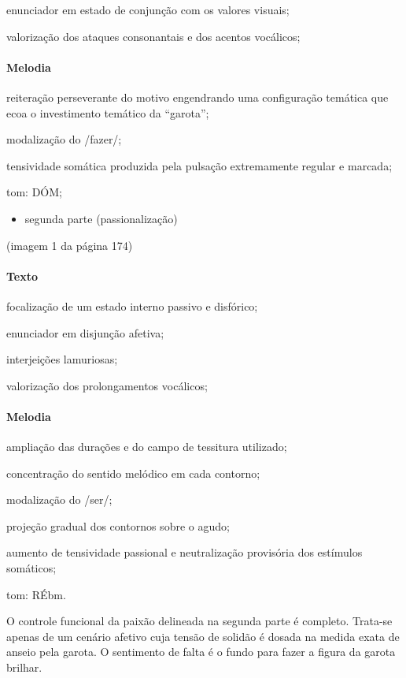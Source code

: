 enunciador em estado de conjunção com os valores visuais;

valorização dos ataques consonantais e dos acentos vocálicos;

\paragraph{Melodia}
reiteração perseverante do motivo engendrando uma configuração temática
que ecoa o investimento temático da ``garota'';

modalização do /fazer/;

tensividade somática produzida pela pulsação extremamente regular e
marcada;

tom: DÓM;

\begin{itemize}
\item
  segunda parte (passionalização)
\end{itemize}

(imagem 1 da página 174)

\paragraph{Texto}
focalização de um estado interno passivo e disfórico;

enunciador em disjunção afetiva;

interjeições lamuriosas;

valorização dos prolongamentos vocálicos;

\paragraph{Melodia}

ampliação das durações e do campo de tessitura utilizado;

concentração do sentido melódico em cada contorno;

modalização do /ser/;

projeção gradual dos contornos sobre o agudo;

aumento de tensividade passional e neutralização provisória dos
estímulos somáticos;

tom: RÉbm.

O controle funcional da paixão delineada na segunda parte é completo.
Trata-se apenas de um cenário afetivo cuja tensão de solidão é dosada na
medida exata de anseio pela garota. O sentimento de falta é o fundo para
fazer a figura da garota brilhar.~

